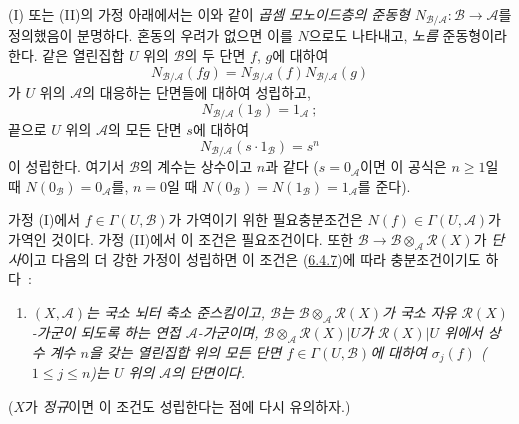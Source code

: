 \begin{env}[6.5.1]
(I) 또는 (II)의 가정 아래에서는 이와 같이 \emph{곱셈 모노이드층의
준동형} $N_{\mathcal{B}/\mathcal{A}}:\mathcal{B}\to\mathcal{A}$를
정의했음이 분명하다. 혼동의 우려가 없으면 이를 $N$으로도 나타내고,
\emph{노름} 준동형이라 한다. 같은 열린집합 $U$ 위의
$\mathcal{B}$의 두 단면 $f$, $g$에 대하여
\[
\label{II.6.5.1.1-ko}
N_{\mathcal{B}/\mathcal{A}}(fg)
=N_{\mathcal{B}/\mathcal{A}}(f)N_{\mathcal{B}/\mathcal{A}}(g)
\tag{6.5.1.1}
\]
가 $U$ 위의 $\mathcal{A}$의 대응하는 단면들에 대하여 성립하고,
\[
\label{II.6.5.1.2-ko}
N_{\mathcal{B}/\mathcal{A}}(1_{\mathcal{B}})=1_{\mathcal{A}}~;
\tag{6.5.1.2}
\]
끝으로 $U$ 위의 $\mathcal{A}$의 모든 단면 $s$에 대하여
\[
\label{II.6.5.1.3-ko}
N_{\mathcal{B}/\mathcal{A}}(s\cdot1_{\mathcal{B}})=s^n
\tag{6.5.1.3}
\]
이 성립한다. 여기서 $\mathcal{B}$의 계수는 상수이고 $n$과 같다
($s=0_{\mathcal{A}}$이면 이 공식은 $n\geq1$일 때
$N(0_{\mathcal{B}})=0_{\mathcal{A}}$를, $n=0$일 때
$N(0_{\mathcal{B}})=N(1_{\mathcal{B}})=1_{\mathcal{A}}$를 준다).

가정 (I)에서 $f\in\Gamma(U,\mathcal{B})$가 가역이기 위한
필요충분조건은 $N(f)\in\Gamma(U,\mathcal{A})$가 가역인 것이다.
가정 (II)에서 이 조건은 필요조건이다. 또한
$\mathcal{B}\to\mathcal{B}\otimes_{\mathcal{A}}\mathcal{R}(X)$가
\emph{단사}이고 다음의 더 강한 가정이 성립하면 이 조건은
(\hyperref[II.6.4.7-ko]{6.4.7})에 따라 충분조건이기도 하다~:
\begin{enumerate}
\item[(II \emph{bis})] \emph{$(X,\mathcal{A})$는 국소 뇌터 축소
준스킴이고, $\mathcal{B}$는
$\mathcal{B}\otimes_{\mathcal{A}}\mathcal{R}(X)$가 국소 자유
$\mathcal{R}(X)$-가군이 되도록 하는 연접 $\mathcal{A}$-가군이며,
$\mathcal{B}\otimes_{\mathcal{A}}\mathcal{R}(X)|U$가
$\mathcal{R}(X)|U$ 위에서 상수 계수 $n$을 갖는 열린집합 위의 모든
단면 $f\in\Gamma(U,\mathcal{B})$에 대하여 $\sigma_j(f)$
($1\leq j\leq n$)는 $U$ 위의 $\mathcal{A}$의 단면이다.}
\end{enumerate}
($X$가 \emph{정규}이면 이 조건도 성립한다는 점에 다시 유의하자.)
\end{env}

